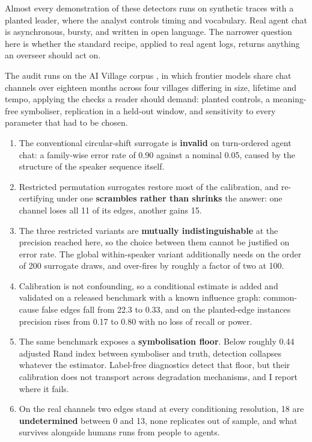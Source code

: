 \documentclass[10pt]{article}
\begin{document}
Almost every demonstration of these detectors runs on synthetic traces with a planted leader, where
the analyst controls timing and vocabulary. Real agent chat is asynchronous, bursty, and written in
open language. The narrower question here is whether the standard recipe, applied to real agent
logs, returns anything an overseer should act on.

The audit runs on the AI Village corpus \citep{aidigest2026}, in which frontier models share chat
channels over eighteen months across four villages differing in size, lifetime and tempo, applying
the checks a reader should demand: planted controls, a meaning-free symboliser, replication in a
held-out window, and sensitivity to every parameter that had to be chosen.

\begin{enumerate}
\item The conventional circular-shift surrogate is \textbf{invalid} on turn-ordered agent chat: a
family-wise error rate of 0.90 against a nominal 0.05, caused by the structure of the speaker
sequence itself.
\item Restricted permutation surrogates restore most of the calibration, and re-certifying under one
\textbf{scrambles rather than shrinks} the answer: one channel loses all 11 of its edges, another
gains 15.
\item The three restricted variants are \textbf{mutually indistinguishable} at the precision reached
here, so the choice between them cannot be justified on error rate. The global within-speaker
variant additionally needs on the order of 200 surrogate draws, and over-fires by roughly a factor
of two at 100.
\item Calibration is not confounding, so a conditional estimate is added and validated on a released
benchmark with a known influence graph: common-cause false edges fall from 22.3 to 0.33, and on the
planted-edge instances precision rises from 0.17 to 0.80 with no loss of recall or power.
\item The same benchmark exposes a \textbf{symbolisation floor}. Below roughly 0.44 adjusted Rand
index between symboliser and truth, detection collapses whatever the estimator. Label-free
diagnostics detect that floor, but their calibration does not transport across degradation
mechanisms, and I report where it fails.
\item On the real channels two edges stand at every conditioning resolution, 18 are
\textbf{undetermined} between 0 and 13, none replicates out of sample, and what survives alongside
humans runs from people to agents.
\end{enumerate}
\end{document}
